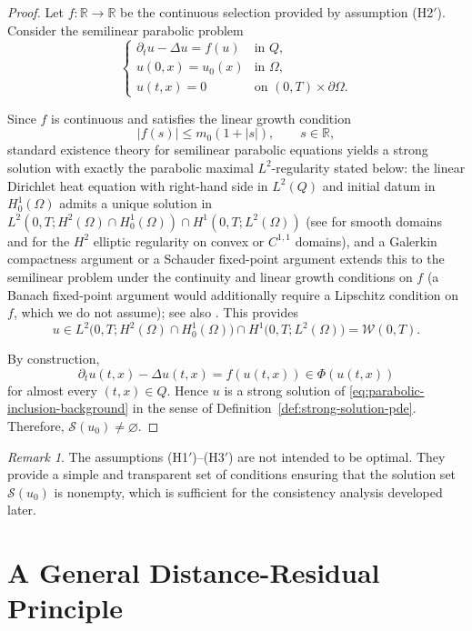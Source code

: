\documentclass[11pt]{elsarticle}
\theoremstyle{definition}
\theoremstyle{remark}
\newtheorem{remark}[theorem]{Remark}
\numberwithin{equation}{section}
\begin{document}
\begin{proof}
	Let $f:\mathbb{R}\to\mathbb{R}$ be the continuous selection provided
	by assumption \textup{(H2$'$)}. Consider the semilinear parabolic
	problem
	\[
	\begin{cases}
		\partial_t u-\Delta u=f(u)
		& \text{in } Q,
		\\
		u(0,x)=u_0(x)
		& \text{in } \Omega,
		\\
		u(t,x)=0
		& \text{on } (0,T)\times\partial\Omega.
	\end{cases}
	\]
	
	Since $f$ is continuous and satisfies the linear growth condition
	\[
	|f(s)|\le m_0(1+|s|),
	\qquad s\in\mathbb{R},
	\]
	standard existence theory for semilinear parabolic equations yields a
	strong solution with exactly the parabolic maximal $L^2$-regularity
	stated below: the linear Dirichlet heat equation with right-hand side in
	$L^2(Q)$ and initial datum in $H_0^1(\Omega)$ admits a unique solution in
	$L^2(0,T;H^2(\Omega)\cap H_0^1(\Omega))\cap H^1(0,T;L^2(\Omega))$
	(see \cite[Section~7.1.3, Theorem~5]{Evans} for smooth domains and
	\cite[Theorem~3.2.1.2]{Grisvard1985} for the $H^2$ elliptic regularity on
	convex or $C^{1,1}$ domains), and a Galerkin compactness argument or a
	Schauder fixed-point argument extends this to the semilinear problem
	under the continuity and linear growth conditions on $f$ (a Banach
	fixed-point argument would additionally require a Lipschitz condition
	on $f$, which we do not assume); see also
	\cite[Chapter~4]{LionsMagenes}. This
	provides
	\[
	u\in
	L^2\!\bigl(0,T;H^2(\Omega)\cap H_0^1(\Omega)\bigr)
	\cap
	H^1\!\bigl(0,T;L^2(\Omega)\bigr)
	=
	\mathcal{W}(0,T).
	\]
	
	By construction,
	\[
	\partial_t u(t,x)-\Delta u(t,x)
	=
	f(u(t,x))
	\in
	\Phi(u(t,x))
	\]
	for almost every $(t,x)\in Q$.
	Hence $u$ is a strong solution of
	\eqref{eq:parabolic-inclusion-background}
	in the sense of Definition~\ref{def:strong-solution-pde}.
	Therefore,
	$\mathcal{S}(u_0)\neq\varnothing$.
\end{proof}

\begin{remark}
	The assumptions \textup{(H1$'$)--(H3$'$)} are not intended to be optimal.
	They provide a simple and transparent set of conditions ensuring that the
	solution set $\mathcal{S}(u_0)$ is nonempty, which is sufficient for the
	consistency analysis developed later.
\end{remark}

	\section{A General Distance-Residual Principle}
	\label{sec:principle}
	
\end{document}
